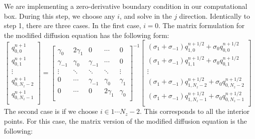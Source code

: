 \documentclass[11pt]{article} %
\begin{document}
We are implementing a zero-derivative boundary condition in our computational box. During this step, we choose any $i$, and solve in the $j$ direction. Identically to step 1, there are three cases. In the first case, $i=0$. The matrix formulation for the modified diffusion equation has the following form:
\[  \begin{bmatrix}
q_{0,0}^{n+1} \\[0.5em]
q_{0,1}^{n+1} \\[0.5em]
\vdots \\[0.5em]
q_{0,N_z-2}^{n+1} \\[0.5em]
q_{0,N_z-1}^{n+1} \\[0.5em]
\end{bmatrix} = 
%
\begin{bmatrix}
\gamma_0 & 2\gamma_1 & 0 & \cdots & 0 \\[0.5em]
\gamma_{-1} & \gamma_0 & \gamma_{-1} &\cdots &0 \\[0.5em]
\vdots & \ddots & \ddots & \ddots & \vdots \\[0.5em]
0 & \cdots & \gamma_{-1} & \gamma_0 & \gamma_1  \\[0.5em]
0 & \cdots & 0 & 2\gamma_1 & \gamma_0 \\[0.5em]
\end{bmatrix}^{-1} 
%
\begin{bmatrix}
(\sigma_1+\sigma_{-1})q_{1,0}^{n+1/2}+ \sigma_0q_{0,0}^{n+1/2} \\[0.5em]
(\sigma_1+\sigma_{-1})q_{1,1}^{n+1/2}+ \sigma_0q_{0,1}^{n+1/2} \\[0.5em]
\vdots \\[0.5em]
(\sigma_1+\sigma_{-1})q_{1,N_z-2}^{n+1/2}+\sigma_0q_{0,N_z-2}^{n+1/2} \\[0.5em]
(\sigma_1+\sigma_{-1})q_{1,N_z-1}^{n+1/2}+ \sigma_0q_{0,N_z-1}^{n+1/2} \\[0.5em]
\end{bmatrix}
\]
\noindent
The second case is if we choose $i \in 1 \cdots N_z -2$. This corresponds to all the interior points. For this case, the matrix version of the modified diffusion equation is the following: 
\end{document}
